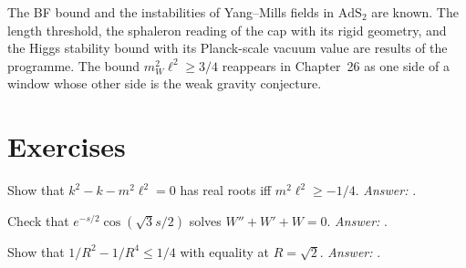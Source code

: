 \begin{standsbox}
The BF bound and the instabilities of Yang--Mills fields in $\mathrm{AdS}_2$ are known. The length threshold, the sphaleron reading of the cap with its rigid geometry, and the Higgs stability bound with its Planck-scale vacuum value are results of the programme. The bound $m_W^2\ell^2\ge3/4$ reappears in Chapter~26 as one side of a window whose other side is the weak gravity conjecture.
\end{standsbox}

\section*{Exercises}
\begin{exercise}Show that $k^2-k-m^2\ell^2=0$ has real roots iff $m^2\ell^2\ge-1/4$. \emph{Answer:} .\end{exercise}
\begin{exercise}Check that $e^{-s/2}\cos(\sqrt3 s/2)$ solves $W''+W'+W=0$. \emph{Answer:} .\end{exercise}
\begin{exercise}Show that $1/R^2-1/R^4\le1/4$ with equality at $R=\sqrt2$. \emph{Answer:} .\end{exercise}
